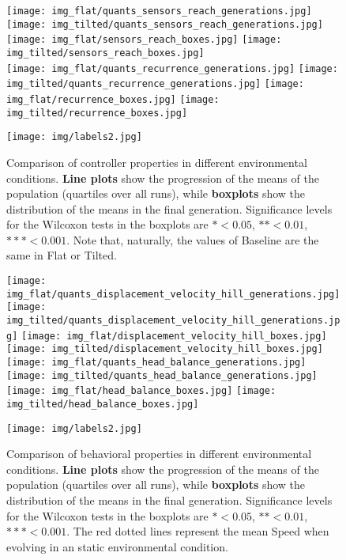 \documentclass[utf8]{frontiersSCNS} %
\begin{document}
\begin{figure}[t]
\centering
    \texttt{[image: img\_flat/quants\_sensors\_reach\_generations.jpg]}
      \texttt{[image: img\_tilted/quants\_sensors\_reach\_generations.jpg]}
    \texttt{[image: img\_flat/sensors\_reach\_boxes.jpg]}
    \texttt{[image: img\_tilted/sensors\_reach\_boxes.jpg]}
        \\
    \texttt{[image: img\_flat/quants\_recurrence\_generations.jpg]}
      \texttt{[image: img\_tilted/quants\_recurrence\_generations.jpg]}
    \texttt{[image: img\_flat/recurrence\_boxes.jpg]}
    \texttt{[image: img\_tilted/recurrence\_boxes.jpg]}
    \\
 
    \begin{center}
     \texttt{[image: img/labels2.jpg]}
        \end{center}
    \caption{Comparison of controller properties in different environmental conditions. \textbf{Line plots} show the progression of the means of the population (quartiles over all runs), while \textbf{boxplots} show the distribution of the means in the final generation. Significance levels for the Wilcoxon tests in the boxplots are $* < 0.05$, $** < 0.01$, $*** < 0.001$. Note that, naturally, the values of Baseline are the same in Flat or Tilted.}
    \label{fig:controllers_gens_seasonal}
 
\end{figure}


 
 
\begin{figure}[t]
 \centering
    \texttt{[image: img\_flat/quants\_displacement\_velocity\_hill\_generations.jpg]}
  \texttt{[image: img\_tilted/quants\_displacement\_velocity\_hill\_generations.jpg]}
    \texttt{[image: img\_flat/displacement\_velocity\_hill\_boxes.jpg]}
    \texttt{[image: img\_tilted/displacement\_velocity\_hill\_boxes.jpg]}
    \\
    \texttt{[image: img\_flat/quants\_head\_balance\_generations.jpg]}
      \texttt{[image: img\_tilted/quants\_head\_balance\_generations.jpg]}
    \texttt{[image: img\_flat/head\_balance\_boxes.jpg]}
    \texttt{[image: img\_tilted/head\_balance\_boxes.jpg]}
 
 
 \texttt{[image: img/labels2.jpg]}
 
    \caption{Comparison of behavioral properties in different environmental conditions. \textbf{Line plots} show the progression of the means of the population (quartiles over all runs), while \textbf{boxplots} show the distribution of the means in the final generation. Significance levels for the Wilcoxon tests in the boxplots are $* < 0.05$, $** < 0.01$, $*** < 0.001$. The red dotted lines represent the mean Speed when evolving in an static environmental condition.}
    \label{fig:behavior_gens_seasonal}
 
\end{figure}
\end{document}

